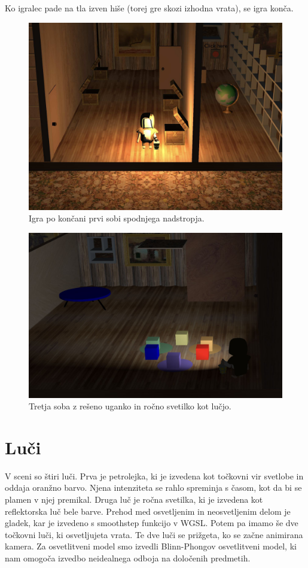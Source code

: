 \documentclass[a4paper,12pt]{article}
\begin{document}
Ko igralec pade na tla izven hiše (torej gre skozi izhodna vrata), se igra konča.


\begin{figure}[!htb]
    \begin{center}
        \includegraphics[width=0.9\columnwidth]{prva.jpg}
        \caption{Igra po končani prvi sobi spodnjega nadstropja.}
    \end{center}
\end{figure}

\begin{figure}[!htb]
    \begin{center}
        \includegraphics[width=0.9\columnwidth]{druga.jpg}
        \caption{Tretja soba z rešeno uganko in ročno svetilko kot lučjo.}
    \end{center}
\end{figure}

\newpage

\section{Luči}
V sceni so štiri luči. Prva je petrolejka, ki je izvedena kot točkovni vir svetlobe in oddaja oranžno barvo. Njena intenziteta se rahlo spreminja s časom, kot da bi se plamen v njej premikal. Druga luč je ročna svetilka, ki je izvedena kot reflektorska luč bele barve. Prehod med osvetljenim in neosvetljenim delom je gladek, kar je izvedeno s smoothstep funkcijo v WGSL. Potem pa imamo še dve točkovni luči, ki osvetljujeta vrata. Te dve luči se prižgeta, ko se začne animirana kamera.
Za osvetlitveni model smo izvedli Blinn-Phongov osvetlitveni model, ki nam omogoča izvedbo neidealnega odboja na določenih predmetih.
\end{document}
